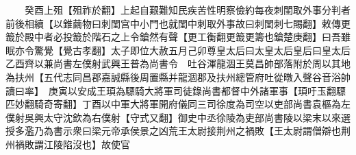 　　癸酉上殂【殂祚於翻】上起自艱難知民疾苦性明察儉約每夜刺閨取外事分判者前後相續【以錐繭物曰刺閨宫中小門也就閨中刺取外事故曰刺閨刺七賜翻】敕傳更籖於殿中者必投籖於階石之上令鎗然有聲【更工衡翻更籖更籌也鎗楚庚翻】曰吾雖眠亦令驚覺【覺古孝翻】太子即位大赦五月己卯尊皇太后曰太皇太后皇后曰皇太后　乙酉齊以兼尚書左僕射武興王普為尚書令　吐谷渾龍涸王莫昌帥部落附於周以其地為扶州【五代志同昌郡嘉誠縣後周置縣并龍涸郡及扶州總管府吐從暾入聲谷音浴帥讀曰率】　庚寅以安成王頊為驃騎大將軍司徒錄尚書都督中外諸軍事【頊吁玉翻驃匹妙翻騎奇寄翻】丁酉以中軍大將軍開府儀同三司徐度為司空以吏部尚書袁樞為左僕射吳興太守沈欽為右僕射【守式又翻】御史中丞徐陵為吏部尚書陵以梁末以來選授多濫乃為書示衆曰梁元帝承侯景之凶荒王太尉接荆州之禍敗【王太尉謂僧辯也荆州禍敗謂江陵陷沒也】故使官